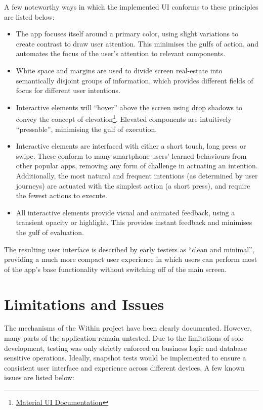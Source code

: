 A few noteworthy ways in which the implemented UI conforms to these principles are listed below:

\begin{itemize}
    \item The app focuses itself around a primary color, using slight variations to create contrast to draw user attention. This minimises the gulfs of action, and automates the focus of the user's attention to relevant components.
    \item White space and margins are used to divide screen real-estate into semantically disjoint groups of information, which provides different fields of focus for different user intentions.
    \item Interactive elements will ``hover'' above the screen using drop shadows to convey the concept of elevation\footnote{\href{https://material.io}{Material UI Documentation}}. Elevated components are intuitively ``pressable'', minimising the gulf of execution.
    \item Interactive elements are interfaced with either a short touch, long press or swipe. These conform to many smartphone users' learned behaviours from other popular apps, removing any form of challenge in actuating an intention. Additionally, the most natural and frequent intentions (as determined by user journeys) are actuated with the simplest action (a short press), and require the fewest actions to execute.
    \item All interactive elements provide visual and animated feedback, using a transient opacity or highlight. This provides instant feedback and minimises the gulf of evaluation.
\end{itemize}

The resulting user interface is described by early testers as ``clean and minimal'', providing a much more compact user experience in which users can perform most of the app's base functionality without switching off of the main screen.

\section{Limitations and Issues}
The mechanisms of the Within project have been clearly documented. However, many parts of the application remain untested. Due to the limitations of solo development, testing was only strictly enforced on business logic and database sensitive operations. Ideally, snapshot tests would be implemented to ensure a consistent user interface and experience across different devices. A few known issues are listed below:

